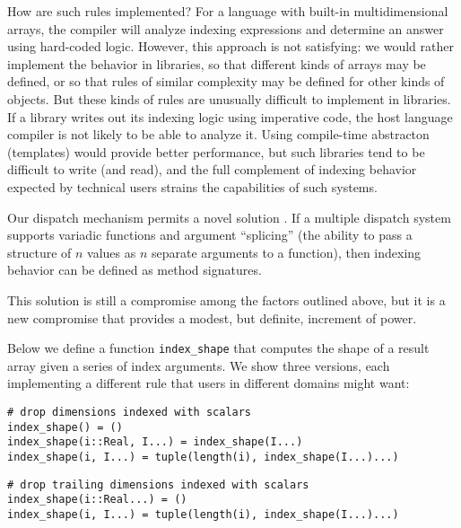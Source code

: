 How are such rules implemented? For a
language with built-in multidimensional arrays, the compiler will
analyze indexing expressions and determine an answer using hard-coded
logic.
However, this approach is not satisfying: we would rather
implement the behavior in libraries, so that different kinds of arrays
may be defined, or so that rules of similar complexity may be
defined for other kinds of objects. But these kinds of rules are
unusually difficult to implement in libraries. If a library writes out
its indexing logic using imperative code, the host language compiler
is not likely to be able to analyze it. Using compile-time abstracton
(templates) would provide better performance, but such libraries tend
to be difficult to write (and read), and the full complement of
indexing behavior expected by technical users strains the capabilities
of such systems.


Our dispatch mechanism permits a novel solution \cite{Bezanson2014}.
If a multiple dispatch
system supports variadic functions and argument ``splicing'' (the ability
to pass a structure of $n$ values as $n$ separate arguments to a function),
then indexing behavior can be defined as method signatures.

This solution is still a compromise among the factors outlined above,
but it is a new compromise that provides a modest, but definite,
increment of power.

Below we define a function \texttt{index\_shape} that computes the
shape of a result array given a series of index arguments. We show
three versions, each implementing a different rule that users in
different domains might want:


\begin{verbatim}
# drop dimensions indexed with scalars
index_shape() = ()
index_shape(i::Real, I...) = index_shape(I...)
index_shape(i, I...) = tuple(length(i), index_shape(I...)...)
\end{verbatim}

\begin{verbatim}
# drop trailing dimensions indexed with scalars
index_shape(i::Real...) = ()
index_shape(i, I...) = tuple(length(i), index_shape(I...)...)
\end{verbatim}

